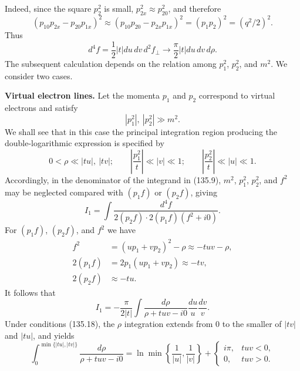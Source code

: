 Indeed, since the square $p_2^2$ is small, $p_{2x}^2\approx p_{20}^2$, and therefore
\[
(p_{10}p_{2x}-p_{20}p_{1x})^2\approx(p_{10}p_{20}-p_{2x}p_{1x})^2=(p_1p_2)^2=(q^2/2)^2.
\]
Thus
\begin{equation}
d^4f=\frac12|t|du\,dv\,d^2f_\perp\to\frac\pi2|t|du\,dv\,d\rho.
\tag{135.16}
\end{equation}
The subsequent calculation depends on the relation among $p_1^2$, $p_2^2$, and $m^2$. We consider two cases.

\textbf{Virtual electron lines.} Let the momenta $p_1$ and $p_2$ correspond to virtual electrons and satisfy
\begin{equation}
|p_1^2|,\ |p_2^2|\gg m^2.
\tag{135.17}
\end{equation}
We shall see that in this case the principal integration region producing the double-logarithmic expression is specified by
\begin{equation}
0<\rho\ll|tu|,\ |tv|;\qquad
\left|\frac{p_1^2}{t}\right|\ll|v|\ll1;\qquad
\left|\frac{p_2^2}{t}\right|\ll|u|\ll1.
\tag{135.18}
\end{equation}
Accordingly, in the denominator of the integrand in (135.9), $m^2$, $p_1^2$, $p_2^2$, and $f^2$ may be neglected compared with $(p_1f)$ or $(p_2f)$, giving
\begin{equation}
I_1=\int\frac{d^4f}{2(p_2f)\cdot2(p_1f)(f^2+i0)}.
\tag{135.19}
\end{equation}
For $(p_1f)$, $(p_2f)$, and $f^2$ we have
\[
\begin{aligned}
f^2&=(up_1+vp_2)^2-\rho\approx-tuv-\rho,\\
2(p_1f)&=2p_1(up_1+vp_2)\approx-tv,\\
2(p_2f)&\approx-tu.
\end{aligned}
\]
It follows that
\begin{equation}
I_1=-\frac{\pi}{2|t|}\int\frac{d\rho}{\rho+tuv-i0}\frac{du}{u}\frac{dv}{v}.
\tag{135.20}
\end{equation}
Under conditions (135.18), the $\rho$ integration extends from 0 to the smaller of $|tv|$ and $|tu|$, and yields
\begin{equation}
\int_0^{\min\{|tu|,|tv|\}}\frac{d\rho}{\rho+tuv-i0}
=\ln\min\left\{\frac1{|u|},\frac1{|v|}\right\}
+\begin{cases}i\pi,&tuv<0,\\0,&tuv>0.\end{cases}
\tag{135.21}
\end{equation}

